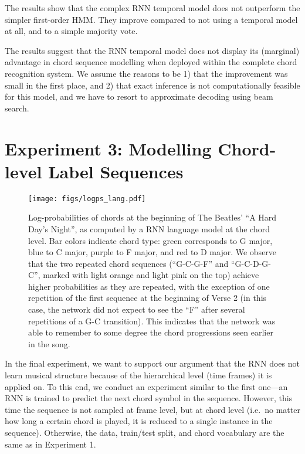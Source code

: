 \documentclass[twocolumn]{article}
\begin{document}
The results show that the complex RNN temporal model does not outperform
the simpler first-order HMM. They improve compared to not using a temporal
model at all, and to a simple majority vote.

The results suggest that the RNN temporal model does not display its
(marginal) advantage in chord sequence modelling when deployed within the
complete chord recognition system. We assume the reasons to be 1) that the
improvement was small in the first place, and 2) that exact inference is not
computationally feasible for this model, and we have to resort to approximate
decoding using beam search.

\section{Experiment 3: Modelling Chord-level Label Sequences}

\begin{figure*}[!ht]
        \centering
        \texttt{[image: figs/logps\_lang.pdf]}
        \caption{Log-probabilities of chords at the beginning of The Beatles'
                 ``A Hard Day's Night'', as computed by a RNN language model at
                 the chord level. Bar colors indicate chord type: green
                 corresponds to G major, blue to C major, purple to F major,
                 and red to D major.
                 We observe that the two repeated chord sequences (``G-C-G-F''
                 and ``G-C-D-G-C'', marked with light orange and light pink
                 on the top) achieve higher probabilities as they
                 are repeated, with the exception of one repetition of the
                 first sequence at the beginning of Verse 2 (in this case, the
                 network did not expect to see the ``F'' after several
                 repetitions of a G-C transition).  This indicates that the
                 network was able to remember to some degree the chord
                 progressions seen earlier in the song.}
        \label{fig:harddaysnight}
\end{figure*}

In the final experiment, we want to support our argument that the RNN does not
learn musical structure because of the hierarchical level (time frames) it is
applied on. To this end, we conduct an experiment similar to the first
one---an RNN is trained to predict the next chord symbol in the sequence.
However, this time the sequence is not sampled at frame level, but at chord
level (i.e.\ no matter how long a certain chord is played, it is reduced to a
single instance in the sequence). Otherwise, the data, train/test split, and
chord vocabulary are the same as in Experiment 1.
\end{document}
